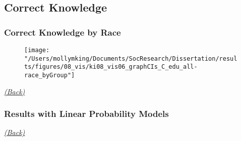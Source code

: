 \documentclass[pdf]{beamer}
\begin{document}
\subsection{Correct Knowledge}

\begin{frame}
\frametitle{Correct Knowledge by Race}
  \begin{figure}[ht]
   \begin{center}
     \texttt{[image: "/Users/mollymking/Documents/SocResearch/Dissertation/results/figures/08\_vis/ki08\_vis06\_graphCIs\_C\_edu\_all-race\_byGroup"]}
   \end{center}
  \end{figure}
    \begin{flushright}
      \emph{\scriptsize{\textcolor{gray}{\hyperlink{supplemental_slides}{(Back)}}}}
    \end{flushright}
\end{frame}

%

\begin{frame}
\frametitle{Results with Linear Probability Models}
  \begin{figure}[ht]
   \begin{center}
   \end{center}
  \end{figure}

    \begin{flushright}
      \emph{\scriptsize{\textcolor{gray}{\hyperlink{supplemental_slides}{(Back)}}}}
    \end{flushright}


\end{frame}
\end{document}
